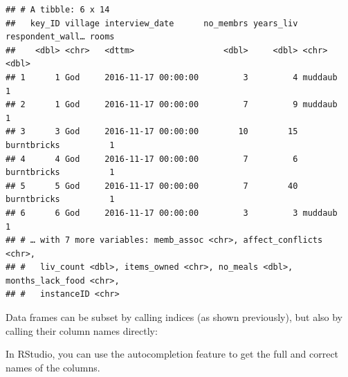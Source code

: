 \documentclass[]{book}
\newenvironment{Shaded}{\begin{snugshade}}{\end{snugshade}}
\newcommand{\StringTok}[1]{\textcolor[rgb]{0.31,0.60,0.02}{#1}}
\newcommand{\CommentTok}[1]{\textcolor[rgb]{0.56,0.35,0.01}{\textit{#1}}}
\newcommand{\OperatorTok}[1]{\textcolor[rgb]{0.81,0.36,0.00}{\textbf{#1}}}
\newcommand{\NormalTok}[1]{#1}
\begin{document}
\begin{verbatim}
## # A tibble: 6 x 14
##   key_ID village interview_date      no_membrs years_liv respondent_wall… rooms
##    <dbl> <chr>   <dttm>                  <dbl>     <dbl> <chr>            <dbl>
## 1      1 God     2016-11-17 00:00:00         3         4 muddaub              1
## 2      1 God     2016-11-17 00:00:00         7         9 muddaub              1
## 3      3 God     2016-11-17 00:00:00        10        15 burntbricks          1
## 4      4 God     2016-11-17 00:00:00         7         6 burntbricks          1
## 5      5 God     2016-11-17 00:00:00         7        40 burntbricks          1
## 6      6 God     2016-11-17 00:00:00         3         3 muddaub              1
## # … with 7 more variables: memb_assoc <chr>, affect_conflicts <chr>,
## #   liv_count <dbl>, items_owned <chr>, no_meals <dbl>, months_lack_food <chr>,
## #   instanceID <chr>
\end{verbatim}

Data frames can be subset by calling indices (as shown previously), but
also by calling their column names directly:

\begin{Shaded}
\end{Shaded}

In RStudio, you can use the autocompletion feature to get the full and
correct names of the columns.
\end{document}
